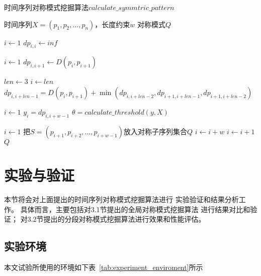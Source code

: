 \begin{algorithm}[t]
  \caption{时间序列对称模式挖掘算法$calculate\_symmtric\_pattern$}
  \label{alg:symmetric_pattern}
  \small
  \begin{algorithmic}
    \REQUIRE 时间序列$X=\left(p_{1}, p_{2}, \dots, p_{n}\right)$，长度约束$w$
    \ENSURE 对称模式$Q$

    \STATE $i \leftarrow 1$
    \STATE $dp_{i,i} \leftarrow inf$
    \ENDWHILE

    \STATE $i \leftarrow 1$
    \STATE $dp_{i,i+1} \leftarrow D\left(p_{i}, p_{i+1}\right)$
    \ENDWHILE

    \STATE $len \leftarrow 3$
    \STATE $i \leftarrow len$
    \STATE $dp_{i,i+len-1} = D\left(p_{i}, p_{i+1}\right)+\min \left(dp_{i,i+len-2},dp_{i+1,i+len-1},dp_{i+1,i+len-2}\right)$
    \ENDWHILE
    \ENDWHILE

    \STATE $i \leftarrow 1$
    \STATE $y_i=dp_{i,i+w-1}$
    \ENDWHILE
    \STATE $\theta = calculate\_threshold\left(y,X\right)$

    \STATE $i \leftarrow 1$
    \STATE 把$S=\left(p_{i+1}, p_{i+2}, \dots, p_{i+w-1}\right)$放入对称子序列集合$Q$
    \STATE $i \leftarrow i+w$
    \ELSE
    \STATE $i \leftarrow i+1$
    \ENDIF
    \ENDWHILE
    \RETURN $Q$
  \end{algorithmic}
\end{algorithm}

\section{实验与验证}
本节将会对上面提出的时间序列对称模式挖掘算法进行
实验验证和结果分析工作。
具体而言，主要包括对3.1节提出的全局对称模式挖掘算法
进行结果对比和验证；
对3.2节提出的分段对称模式挖掘算法进行效果和性能评估。
\subsection{实验环境}
本文试验所使用的环境如下表~\ref{tab:experiment_enviroment}所示


